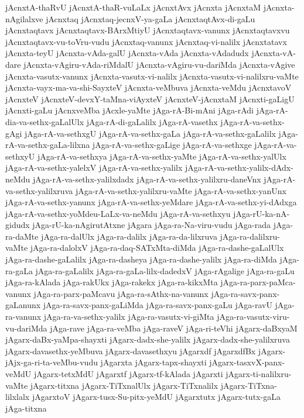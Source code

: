 {jAcnxtA-thaRvU
jAcnxtA-thaR-vuLaLx
jAcnxtAvx
jAcnxta
jAcnxtaM
jAcnxta-nAgilalxve
jAcnxtaq
jAcnxtaq-jecnxV-ya-gaLa
jAcnxtaqtAvx-di-gaLu
jAcnxtaqtavx
jAcnxtaqtavx-BArxMtiyU
jAcnxtaqtavx-vanunx
jAcnxtaqtavxvu
jAcnxtaqtavx-vu-toVru-vudu
jAcnxtaq-vanunx
jAcnxtaq-vi-nalilx
jAcnxtatavx
jAcnxta-teyU
jAcnxta-vAda-galU
jAcnxta-vAda
jAcnxta-vAdadudx
jAcnxta-vA-dare
jAcnxta-vAgiru-vAda-riMdalU
jAcnxta-vAgiru-vu-dariMda
jAcnxta-vAgive
jAcnxta-vasutx-vanunx
jAcnxta-vasutx-vi-nalilx
jAcnxta-vasutx-vi-nalilxru-vaMte
jAcnxta-vayx-ma-va-shi-SayxteV
jAcnxta-veMbuva
jAcnxta-veMdu
jAcnxtavoV
jAcnxteV
jAcnxteV-devxY-taMna-viAyxteV
jAcnxteV-jAcnxtaM
jAcnxti-gaLigU
jAcnxti-gaLu
jAcnxveMba
jAcxle-yaMte
jAga-rA-Bi-mAni
jAga-rAdi
jAga-rA-dia-va-sethx-gaLalUlx
jAga-rA-di-gaLalilx
jAga-rA-vasethx
jAga-rA-va-sethx-gAgi
jAga-rA-va-sethxgU
jAga-rA-va-sethx-gaLa
jAga-rA-va-sethx-gaLalilx
jAga-rA-va-sethx-gaLa-lilxna
jAga-rA-va-sethx-gaLige
jAga-rA-va-sethxge
jAga-rA-va-sethxyU
jAga-rA-va-sethxya
jAga-rA-va-sethx-yaMte
jAga-rA-va-sethx-yalUlx
jAga-rA-va-sethx-yalelxV
jAga-rA-va-sethx-yalilx
jAga-rA-va-sethx-yalilx-dAdx-neMdu
jAga-rA-va-sethx-yalilxdadx
jAga-rA-va-sethx-yalilxru-daneVnx
jAga-rA-va-sethx-yalilxruva
jAga-rA-va-sethx-yalilxru-vaMte
jAga-rA-va-sethx-yanUnx
jAga-rA-va-sethx-yanunx
jAga-rA-va-sethx-yeMdare
jAga-rA-va-sethx-yi-dAdxga
jAga-rA-va-sethx-yoMdeu-LaLx-va-neMdu
jAga-rA-va-sethxyu
jAga-rU-ka-nA-gidudx
jAga-rU-ka-nAgirutAtxne
jAgara
jAga-ra-Na-viru-vudu
jAga-rada
jAga-ra-daMte
jAga-ra-dalUlx
jAga-ra-dalilx
jAga-ra-da-lilxruva
jAga-ra-dalilxru-vaMte
jAga-ra-dalolxV
jAga-ra-daq-SATxMta-diMda
jAga-ra-dashe-gaLalUlx
jAga-ra-dashe-gaLalilx
jAga-ra-dasheya
jAga-ra-dashe-yalilx
jAga-ra-diMda
jAga-ra-gaLa
jAga-ra-gaLalilx
jAga-ra-gaLa-lilx-dadedxV
jAga-rAgalige
jAga-ra-gaLu
jAga-ra-kAlada
jAga-rakUkx
jAga-rakekx
jAga-ra-kikxMta
jAga-ra-parx-paMca-vanunx
jAga-ra-parx-paMcavu
jAga-ra-sAthx-na-vanunx
jAga-ra-savx-panx-gaLanunx
jAga-ra-savx-panx-gaLiMda
jAga-ra-savx-panx-gaLu
jAga-ravU
jAga-ra-vanunx
jAga-ra-va-sethx-yalilx
jAga-ra-vasutx-vi-giMta
jAga-ra-vasutx-viru-vu-dariMda
jAga-rave
jAga-ra-veMba
jAga-raveV
jAga-ri-teVhi
jAgarx-daBxyaM
jAgarx-daBx-yaMpa-shayxti
jAgarx-dadx-she-yalilx
jAgarx-dadx-she-yalilxruva
jAgarx-davasethx-yeMbuva
jAgarx-davasethxyu
jAgarxdf
jAgarxdfBx
jAgarx-jAjx-ga-ri-ta-veMbu-vudu
jAgarxta
jAgarx-tapx-shayxti
jAgarx-tasxvX-panx-veMdU
jAgarx-tetxMdU
jAgarxtf
jAgarx-tf-kAlada
jAgarxti
jAgarx-ti-nalilxru-vaMte
jAgarx-titxna
jAgarx-TiTxnalUlx
jAgarx-TiTxnalilx
jAgarx-TiTxna-lilxlalx
jAgarxtoV
jAgarx-tusx-Su-pitx-yeMdU
jAgarxtutx
jAgarx-tutx-gaLa
jAga-titxna
}
